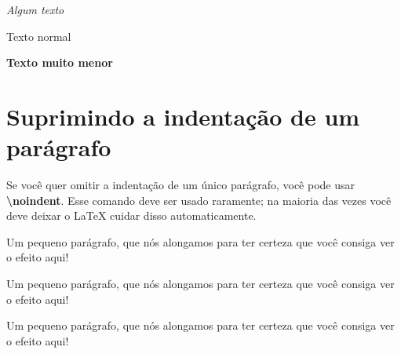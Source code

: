 \documentclass[brazilian, 12pt]{article}
\begin{document}
\begin{center}
{\itshape \huge Algum texto\par}
Texto normal\\
{\bfseries \tiny Texto muito menor\par}
\end{center}


\section{Suprimindo a indentação de um parágrafo}
Se você quer omitir a indentação de um único parágrafo, você pode usar \textbf{\textbackslash noindent}. Esse comando deve ser usado raramente; na maioria das vezes você deve deixar o LaTeX cuidar disso automaticamente.

Um pequeno parágrafo, que nós alongamos para ter certeza que você consiga ver o efeito aqui!

Um pequeno parágrafo, que nós alongamos para ter certeza que você consiga ver o efeito aqui!

\noindent Um pequeno parágrafo, que nós alongamos para ter certeza que você consiga ver o efeito aqui!
\end{document}
